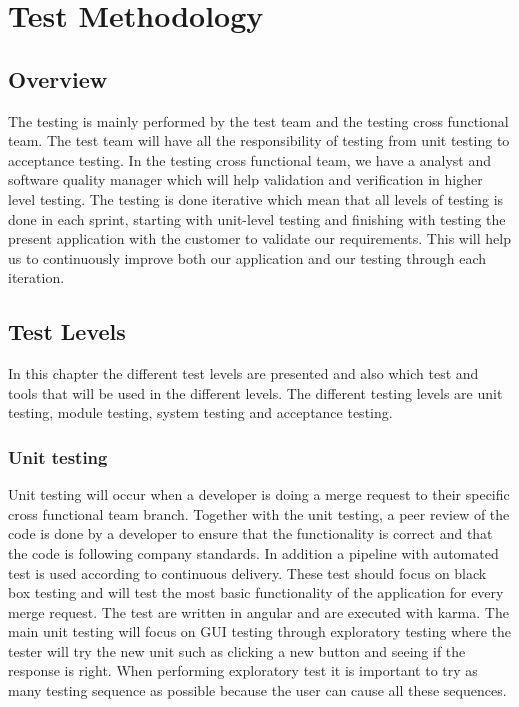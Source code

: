 \section{Test Methodology}
\subsection{Overview}
The testing is mainly performed by the test team and the testing cross functional team. The test team will have all the responsibility of testing from unit testing to acceptance testing. In the testing cross functional team, we have a analyst and software quality manager which will help validation and verification in higher level testing. The testing is done iterative which mean that all levels of testing is done in each sprint, starting with unit-level testing and finishing with testing the present application with the customer to validate our requirements. This will help us to continuously improve both our application and our testing through each iteration.
\subsection{Test Levels}
In this chapter the different test levels are presented and also which test and tools that will be used in the different levels. The different testing levels are unit testing, module testing, system testing and acceptance testing.
\subsubsection{Unit testing}
\noindent Unit testing will occur when a developer is doing a merge request to their specific cross functional team branch. Together with the unit testing, a peer review of the code is done by a developer to ensure that the functionality is correct and that the code is following company standards. In addition a pipeline with automated test is used according to continuous delivery. These test should focus on black box testing and will test the most basic functionality of the application for every merge request. The test are written in angular and are executed with karma. The main unit testing will focus on GUI testing through exploratory testing where the tester will try the new unit such as clicking a new button and seeing if the response is right. When performing exploratory test it is important to try as many testing sequence as possible because the user can cause all these sequences.\newline

